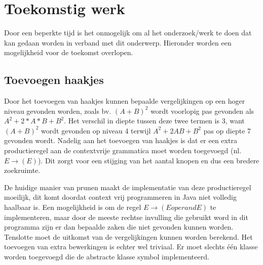\documentclass[Main.tex]{subfiles}
\begin{document}
\section{Toekomstig werk}
Door een beperkte tijd is het onmogelijk om al het onderzoek/werk te doen dat kan gedaan worden in verband met dit onderwerp. Hieronder worden een mogelijkheid voor de toekomst overlopen.

\subsection*{Toevoegen haakjes}
Door het toevoegen van haakjes kunnen bepaalde vergelijkingen op een hoger niveau gevonden worden, zoals bv. $(A+B)^2$ wordt voorlopig pas gevonden als $A^{2}+2 \ast A \ast B+B^{2}$. Het verschil in diepte tussen deze twee termen is 3, want $(A+B)^2$ wordt gevonden op niveau 4 terwijl $A^{2}+2AB+B^{2}$ pas op diepte 7 gevonden wordt. Nadelig aan het toevoegen van haakjes is dat er een extra productieregel aan de contextvrije grammatica moet worden toegevoegd (nl. $E \rightarrow (E)$). Dit zorgt voor een stijging van het aantal knopen en dus een bredere zoekruimte. 

\par De huidige manier van prunen maakt de implementatie van deze productieregel moeilijk, dit komt doordat context vrij programmeren in Java niet volledig haalbaar is. Een mogelijkheid is om de regel $E \rightarrow (E operand E)$ te implementeren, maar door de meeste rechtse invulling die gebruikt word in dit programma zijn er dan bepaalde zaken die niet gevonden kunnen worden. Tenslotte moet de uitkomst van de vergelijkingen kunnen worden berekend. Het toevoegen van extra bewerkingen is echter wel triviaal. Er moet slechts \'e\'en klasse worden toegevoegd die de abstracte klasse symbol implementeerd.
\end{document}
